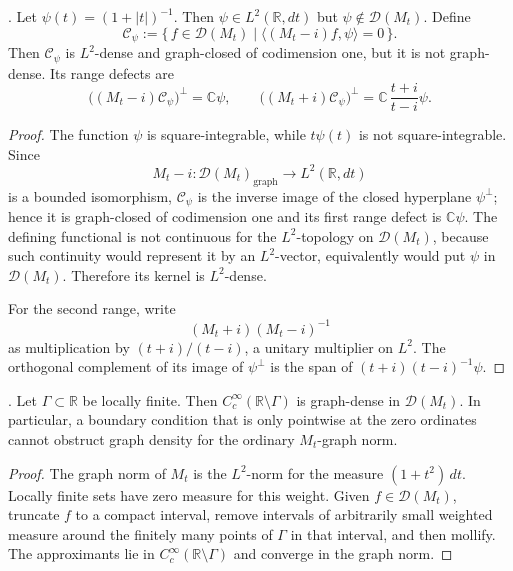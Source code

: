 \begin{lemma}
\label{v4-arith:w9-r4:lem:rank-one-graph-boundary}
\ClaimStatusProvedHere. Let
\(\psi(t)=(1+|t|)^{-1}\). Then
\(\psi\in L^{2}(\mathbb{R},dt)\) but
\(\psi\notin\mathcal{D}(M_t)\). Define
\[
\mathcal{C}_{\psi}
:=
\{\,f\in\mathcal{D}(M_t)\mid
\langle (M_t-i)f,\psi\rangle=0\,\}.
\]
Then \(\mathcal{C}_{\psi}\) is \(L^{2}\)-dense and graph-closed of
codimension one, but it is not graph-dense. Its range defects are
\[
\bigl((M_t-i)\mathcal{C}_{\psi}\bigr)^{\perp}
=\mathbb C\psi,
\qquad
\bigl((M_t+i)\mathcal{C}_{\psi}\bigr)^{\perp}
=
\mathbb C\,\frac{t+i}{t-i}\psi .
\]
\end{lemma}

\begin{proof}
The function \(\psi\) is square-integrable, while
\(t\psi(t)\) is not square-integrable. Since
\[
M_t-i\colon\mathcal{D}(M_t)_{\mathrm{graph}}\to L^2(\mathbb R,dt)
\]
is a bounded isomorphism, \(\mathcal{C}_{\psi}\) is the inverse image
of the closed hyperplane \(\psi^\perp\); hence it is graph-closed of
codimension one and its first range defect is \(\mathbb C\psi\).
The defining functional is not continuous for the \(L^2\)-topology on
\(\mathcal{D}(M_t)\), because such continuity would represent it by
an \(L^2\)-vector, equivalently would put \(\psi\) in
\(\mathcal{D}(M_t)\). Therefore its kernel is \(L^2\)-dense.

For the second range, write
\[
(M_t+i)(M_t-i)^{-1}
\]
as multiplication by \((t+i)/(t-i)\), a unitary multiplier on \(L^2\).
The orthogonal complement of its image of \(\psi^\perp\) is the span
of \((t+i)(t-i)^{-1}\psi\).
\end{proof}

\begin{lemma}
\label{v4-arith:w9-r4:lem:point-conditions-graph-invisible}
\ClaimStatusProvedHere. Let \(\Gamma\subset\mathbb R\) be locally
finite. Then \(C_c^\infty(\mathbb R\setminus\Gamma)\) is graph-dense
in \(\mathcal{D}(M_t)\). In particular, a boundary condition that is
only pointwise at the zero ordinates cannot obstruct graph density for
the ordinary \(M_t\)-graph norm.
\end{lemma}

\begin{proof}
The graph norm of \(M_t\) is the \(L^2\)-norm for the measure
\((1+t^2)\,dt\). Locally finite sets have zero measure for this
weight. Given \(f\in\mathcal{D}(M_t)\), truncate \(f\) to a compact
interval, remove intervals of arbitrarily small weighted measure
around the finitely many points of \(\Gamma\) in that interval, and
then mollify. The approximants lie in
\(C_c^\infty(\mathbb R\setminus\Gamma)\) and converge in the graph
norm.
\end{proof}

